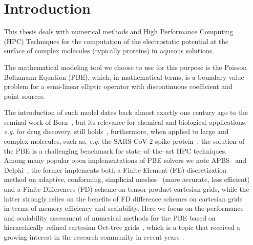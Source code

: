 \documentclass[11pt,a4paper,twocolumn]{article}
\begin{document}



\section{Introduction}
\label{sec:introduction}

This thesis deals with numerical methods and High Performance Computing (HPC) 
Techniques for the computation of the electrostatic potential at the surface
of complex molecules (typically proteins) in aqueous solutions.

The mathematical modeling tool we choose to use for this purpose is the 
Poisson Boltzmann Equation (PBE), which, in mathematical terms, 
is a boundary value problem for a semi-linear elliptic operator with 
discontinuous coefficient and point sources.  

The introduction of such model dates back almost exactly one century ago 
to the seminal work of Born~\cite{ref2}, but its relevance for chemical
and biological applications, {\it e.g.} for drug discovery, still holds~\cite{ref1},
furthermore, when applied to large and complex molecules, such as, {\it e.g.} the 
SARS-CoV-2 spike protein~\cite{ref14}, the solution of the PBE is a challenging 
benchmark for state--of--the--art HPC techniques.
Among  many popular open implementations of PBE solvers we note APBS~\cite{ref3} and 
Delphi~\cite{ref6,ref7,ref7a,ref7b}, the former implements both a Finite Element (FE) 
discretization method on adaptive, conforming, simplicial meshes~\cite{ref4,ref5} 
(more accurate, less efficient) and a Finite Differences (FD) scheme on tensor product
cartesian grids, while the latter strongly relies on the benefits of FD difference
schemes on cartesian grids in terms of memory efficiency and scalability.
Here we focus on the performance and scalability  assessment of numerical methods 
for the PBE based on hierarchically refined cartesian 
Oct-tree grids~\cite{ref10,ref11}, which is a topic that received a growing interest
in the research community in recent years~\cite{ref12,ref14,ref15}.
\end{document}

